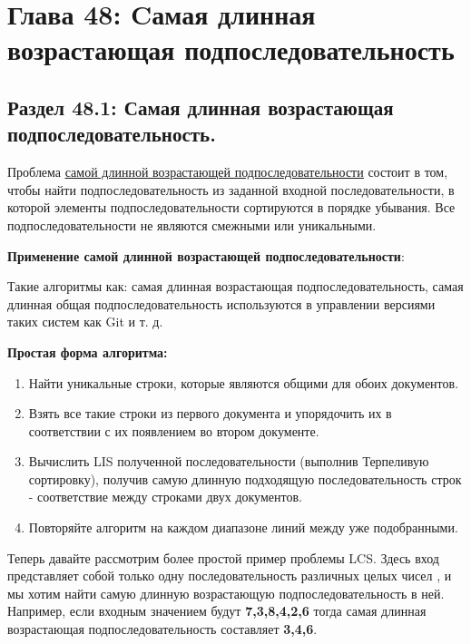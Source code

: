 \newpage
\chapter*{Глава 48: Cамая длинная возрастающая подпоследовательность}
\section*{Раздел 48.1: Самая длинная возрастающая подпоследовательность.}
Проблема \href{https://en.wikipedia.org/wiki/Longest_increasing_subsequence}{\underline{самой длинной возрастающей подпоследовательности}} состоит в
том, чтобы найти подпоследовательность из заданной входной
последовательности, в которой элементы подпоследовательности
сортируются в порядке убывания. Все подпоследовательности не являются
смежными или уникальными.
\vspace{\baselineskip}

\textbf{Применение самой длинной возрастающей подпоследовательности}:
\vspace{\baselineskip}

Такие алгоритмы как: самая длинная возрастающая подпоследовательность,
самая длинная общая подпоследовательность используются в управлении
версиями таких систем как Git и т. д.
\vspace{\baselineskip}

\textbf{Простая форма алгоритма:}
\vspace{\baselineskip}
\begin{enumerate}
    \item Найти уникальные строки, которые являются общими для обоих
документов.
    \item Взять все такие строки из первого документа и упорядочить их в
соответствии с их появлением во втором документе.
    \item Вычислить LIS полученной последовательности (выполнив Терпеливую
сортировку), получив самую длинную подходящую последовательность
строк - соответствие между строками двух документов.
    \item Повторяйте алгоритм на каждом диапазоне линий между уже
подобранными.
\end{enumerate}
Теперь давайте рассмотрим более простой пример проблемы LCS. Здесь
вход представляет собой только одну последовательность различных целых
чисел , и мы хотим найти самую длинную возрастающую
подпоследовательность в ней. Например, если входным значением будут
\textbf{7,3,8,4,2,6} тогда самая длинная возрастающая подпоследовательность
составляет \textbf{3,4,6}.
\vspace{\baselineskip}

